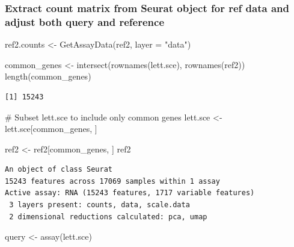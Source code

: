 \documentclass[
  letterpaper,
  DIV=11,
  numbers=noendperiod]{scrartcl}
\newenvironment{Shaded}{\begin{snugshade}}{\end{snugshade}}
\newcommand{\AttributeTok}[1]{\textcolor[rgb]{0.40,0.45,0.13}{#1}}
\newcommand{\CommentTok}[1]{\textcolor[rgb]{0.37,0.37,0.37}{#1}}
\newcommand{\FunctionTok}[1]{\textcolor[rgb]{0.28,0.35,0.67}{#1}}
\newcommand{\NormalTok}[1]{\textcolor[rgb]{0.00,0.23,0.31}{#1}}
\newcommand{\OtherTok}[1]{\textcolor[rgb]{0.00,0.23,0.31}{#1}}
\newcommand{\StringTok}[1]{\textcolor[rgb]{0.13,0.47,0.30}{#1}}
\begin{document}
\hypertarget{extract-count-matrix-from-seurat-object-for-ref-data-and-adjust-both-query-and-reference}{%
\subsubsection{Extract count matrix from Seurat object for ref data and
adjust both query and
reference}\label{extract-count-matrix-from-seurat-object-for-ref-data-and-adjust-both-query-and-reference}}

\begin{Shaded}
\begin{Highlighting}[]
\NormalTok{ref2.counts }\OtherTok{\textless{}{-}}  \FunctionTok{GetAssayData}\NormalTok{(ref2, }\AttributeTok{layer =} \StringTok{"data"}\NormalTok{)}

\NormalTok{common\_genes }\OtherTok{\textless{}{-}} \FunctionTok{intersect}\NormalTok{(}\FunctionTok{rownames}\NormalTok{(lett.sce), }\FunctionTok{rownames}\NormalTok{(ref2))}
\FunctionTok{length}\NormalTok{(common\_genes)}
\end{Highlighting}
\end{Shaded}

\begin{verbatim}
[1] 15243
\end{verbatim}

\begin{Shaded}
\begin{Highlighting}[]
\CommentTok{\# Subset lett.sce to include only common genes}
\NormalTok{lett.sce }\OtherTok{\textless{}{-}}\NormalTok{ lett.sce[common\_genes, ]}

\NormalTok{ref2 }\OtherTok{\textless{}{-}}\NormalTok{ ref2[common\_genes, ]}
\NormalTok{ref2}
\end{Highlighting}
\end{Shaded}

\begin{verbatim}
An object of class Seurat 
15243 features across 17069 samples within 1 assay 
Active assay: RNA (15243 features, 1717 variable features)
 3 layers present: counts, data, scale.data
 2 dimensional reductions calculated: pca, umap
\end{verbatim}

\begin{Shaded}
\begin{Highlighting}[]
\NormalTok{query }\OtherTok{\textless{}{-}} \FunctionTok{assay}\NormalTok{(lett.sce)}
\end{Highlighting}
\end{Shaded}
\end{document}
